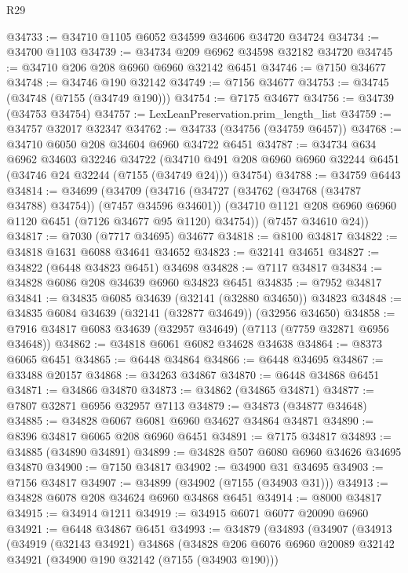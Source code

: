 \begin{lexlean}{R29}
\begin{coremodule}
@34733 := @34710 @1105 @6052 @34599 @34606 @34720 @34724
@34734 := @34700 @1103
@34739 := @34734 @209 @6962 @34598 @32182 @34720
@34745 := @34710 @206 @208 @6960 @6960 @32142 @6451
@34746 := @7150 @34677
@34748 := @34746 @190 @32142
@34749 := @7156 @34677
@34753 := @34745 (@34748 (@7155 (@34749 @190)))
@34754 := @7175 @34677
@34756 := @34739 (@34753 @34754)
@34757 := LexLeanPreservation.prim_length_list
@34759 := @34757 @32017 @32347
@34762 := @34733 (@34756 (@34759 @6457))
@34768 := @34710 @6050 @208 @34604 @6960 @34722 @6451
@34787 := @34734
    @634
    @6962
    @34603
    @32246
    @34722
    (@34710 @491 @208 @6960 @6960 @32244 @6451 (@34746 @24 @32244 (@7155 (@34749 @24))) @34754)
@34788 := @34759 @6443
@34814 := @34699
    (@34709
      (@34716
        (@34727 (@34762 (@34768 (@34787 @34788) @34754)) (@7457 @34596 @34601))
        (@34710 @1121 @208 @6960 @6960 @1120 @6451 (@7126 @34677 @95 @1120) @34754))
      (@7457 @34610 @24))
@34817 := @7030 (@7717 @34695) @34677
@34818 := @8100 @34817
@34822 := @34818 @1631 @6088 @34641 @34652
@34823 := @32141 @34651
@34827 := @34822 (@6448 @34823 @6451) @34698
@34828 := @7117 @34817
@34834 := @34828 @6086 @208 @34639 @6960 @34823 @6451
@34835 := @7952 @34817
@34841 := @34835 @6085 @34639 (@32141 (@32880 @34650)) @34823
@34848 := @34835 @6084 @34639 (@32141 (@32877 @34649)) (@32956 @34650)
@34858 := @7916 @34817 @6083 @34639 (@32957 @34649) (@7113 (@7759 @32871 @6956 @34648))
@34862 := @34818 @6061 @6082 @34628 @34638
@34864 := @8373 @6065 @6451
@34865 := @6448 @34864
@34866 := @6448 @34695
@34867 := @33488 @20157
@34868 := @34263 @34867
@34870 := @6448 @34868 @6451
@34871 := @34866 @34870
@34873 := @34862 (@34865 @34871)
@34877 := @7807 @32871 @6956 @32957 @7113
@34879 := @34873 (@34877 @34648)
@34885 := @34828 @6067 @6081 @6960 @34627 @34864 @34871
@34890 := @8396 @34817 @6065 @208 @6960 @6451
@34891 := @7175 @34817
@34893 := @34885 (@34890 @34891)
@34899 := @34828 @507 @6080 @6960 @34626 @34695 @34870
@34900 := @7150 @34817
@34902 := @34900 @31 @34695
@34903 := @7156 @34817
@34907 := @34899 (@34902 (@7155 (@34903 @31)))
@34913 := @34828 @6078 @208 @34624 @6960 @34868 @6451
@34914 := @8000 @34817
@34915 := @34914 @1211
@34919 := @34915 @6071 @6077 @20090 @6960
@34921 := @6448 @34867 @6451
@34993 := @34879
    (@34893
      (@34907
        (@34913
          (@34919
            (@32143 @34921)
            @34868
            (@34828
              @206
              @6076
              @6960
              @20089
              @32142
              @34921
              (@34900 @190 @32142 (@7155 (@34903 @190)))

\end{coremodule}
\end{lexlean}
